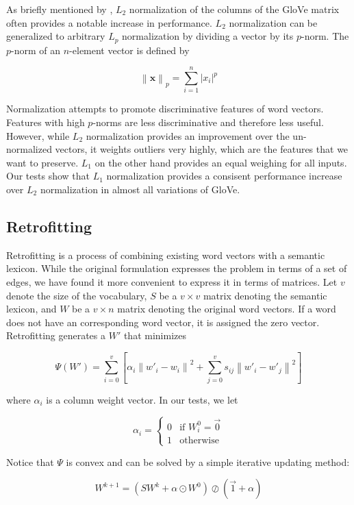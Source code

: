 \documentclass[letterpaper]{article}
\begin{document}
As briefly mentioned by , $L_2$ normalization of
the columns of the GloVe matrix often provides a notable increase in
performance. $L_2$ normalization can be generalized to arbitrary
$L_p$ normalization by dividing a vector by its $p$-norm. The $p$-norm of an
$n$-element vector is defined by

$$ \left\|\mathbf{x}\right\|_p
  = \sum_{i=1}^n \left|x_i\right|^p$$

Normalization attempts to promote discriminative features of word vectors.
Features with high $p$-norms are less discriminative and therefore less useful.
However, while $L_2$ normalization provides an improvement over the un-normalized
vectors, it weights outliers very highly, which are the features that we want to
preserve. $L_1$ on the other hand provides an equal weighing for all inputs.
Our tests show that $L_1$ normalization provides a consisent performance
increase over $L_2$ normalization in almost all variations of GloVe.

\subsection{Retrofitting}

Retrofitting \cite{faruqui2014retrofitting} is a process of combining existing word vectors with a semantic
lexicon. While the original formulation expresses the problem in terms of a set
of edges, we have found it more convenient to express it in terms of matrices.
Let $v$ denote the size of the vocabulary, $S$ be a $v \times v$ matrix
denoting the semantic lexicon, and $W$ be a $v \times n$ matrix denoting the
original word vectors. If a word does not have an
corresponding word vector, it is assigned the zero vector. Retrofitting
generates a $W'$ that minimizes

$$
\Psi \left( W' \right) = \sum_{i=0}^v \left[
  \alpha_i \left\|  w'_i - w_i \right\| ^ 2
  + \sum_{j=0}^v s_{ij} \left\| w'_i - w'_j \right\| ^ 2
\right]
$$

where $\alpha_i$ is a column weight vector. In our tests, we let

$$
\alpha_i =
  \begin{cases}
    0 & \text{if $W^0_i = \vec{0}$} \\
    1 & \text{otherwise}
  \end{cases}
$$

Notice that $\Psi$ is convex and can be solved by a simple iterative updating
method:

$$
W^{k+1} = \left( S W^k + \alpha \odot W^0 \right)
\oslash \left( \vec{1} + \alpha \right)
$$
\end{document}
